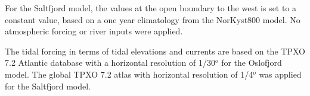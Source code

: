 For the Saltfjord model, the values at the open boundary to the west is set to a constant value, based on a one year climatology from the NorKyst800 model. No atmospheric forcing or river inputs were applied.

The tidal forcing in terms of tidal elevations and currents are based on the TPXO 7.2 Atlantic database with a horizontal resolution of 1/30$^o$ \cite[]{egbert02} for the Oslofjord model. The global TPXO 7.2 atlas with  horizontal resolution of 1/4$^o$ was applied for the Saltfjord model. 
